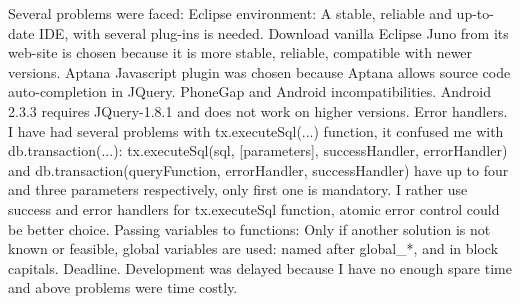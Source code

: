 Several problems were faced:
Eclipse environment: A stable, reliable and up-to-date IDE, with several plug-ins is needed. Download vanilla Eclipse Juno from its web-site is chosen because it is more stable, reliable, compatible with newer versions.  Aptana Javascript plugin was chosen because Aptana allows source code auto-completion in JQuery.
PhoneGap and Android incompatibilities. Android 2.3.3 requires JQuery-1.8.1 and does not work on higher versions. 
Error handlers. I have had several problems with tx.executeSql(...) function, it confused me with db.transaction(...): 
tx.executeSql(sql, [parameters],  successHandler, errorHandler)
and
db.transaction(queryFunction, errorHandler, successHandler)  
have up to four and three parameters respectively, only first one is mandatory. I rather use success and error handlers for tx.executeSql function, atomic error control could be better choice.
Passing variables to functions: Only if another solution is not known or feasible, global variables are used: named after global_*, and in block capitals.
Deadline. Development was delayed because I have no enough spare time and above problems were time costly.
